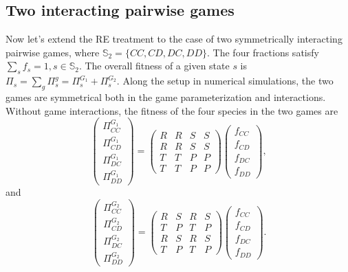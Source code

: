 \documentclass[showpacs,superscriptaddress,reprint,nofootinbib,amsmath,amssymb,aps,pre]{revtex4-1}
\begin{document}
\subsection{Two interacting pairwise games}\label{subsec:MF2}
Now let's extend the RE treatment to the case of two symmetrically interacting pairwise games, where $\mathbb{S}_2=\{CC,CD,DC,DD\}$. The four fractions satisfy $\sum_s f_s=1, s\in\mathbb{S}_2$.
The overall fitness of a given state $s$ is $\Pi_{s}=\sum_{g}\Pi_{s}^{g}=\Pi_{s}^{G_1}+\Pi_{s}^{G_2}$. Along the setup in numerical simulations, the two games are symmetrical both in the game parameterization and interactions. Without game interactions, the fitness of the four species in the two games are
\begin{equation}
\begin{pmatrix}
\Pi^{G_1}_{CC} \\ \Pi^{G_1}_{CD} \\ \Pi^{G_1}_{DC} \\ \Pi^{G_1}_{DD} 
\end{pmatrix}
=
\begin{pmatrix}
R & R & S & S \\
R & R & S & S \\
T & T & P & P \\
T & T & P & P 
\end{pmatrix}
\begin{pmatrix}
f_{CC} \\ f_{CD} \\ f_{DC} \\ f_{DD} 
\end{pmatrix},
\label{eq:MF_f1}
\end{equation}
and 
\begin{equation}
\begin{pmatrix}
\Pi^{G_2}_{CC} \\ \Pi^{G_2}_{CD} \\ \Pi^{G_2}_{DC} \\ \Pi^{G_2}_{DD} 
\end{pmatrix}
=
\begin{pmatrix}
R & S & R & S \\
T & P & T & P \\
R & S & R & S \\
T & P & T & P 
\end{pmatrix}
\begin{pmatrix}
f_{CC} \\ f_{CD} \\ f_{DC} \\ f_{DD} 
\end{pmatrix}.
\label{eq:MF_f2}
\end{equation}
\end{document}
